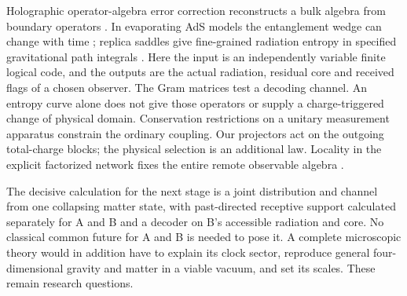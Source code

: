 Holographic operator-algebra error correction reconstructs a bulk algebra from boundary operators \cite{holoqec}. In evaporating AdS models the entanglement wedge can change with time \cite{penington}; replica saddles give fine-grained radiation entropy in specified gravitational path integrals \cite{islands}. Here the input is an independently variable finite logical code, and the outputs are the actual radiation, residual core and received flags of a chosen observer. The Gram matrices test a decoding channel. An entropy curve alone does not give those operators or supply a charge-triggered change of physical domain. Conservation restrictions on a unitary measurement apparatus \cite{way} constrain the ordinary coupling. Our projectors act on the outgoing total-charge blocks; the physical selection is an additional law. Locality in the explicit factorized network fixes the entire remote observable algebra \cite{beckman}.

The decisive calculation for the next stage is a joint distribution and channel from one collapsing matter state, with past-directed receptive support calculated separately for A and B and a decoder on B's accessible radiation and core. No classical common future for A and B is needed to pose it. A complete microscopic theory would in addition have to explain its clock sector, reproduce general four-dimensional gravity and matter in a viable vacuum, and set its scales. These remain research questions.

